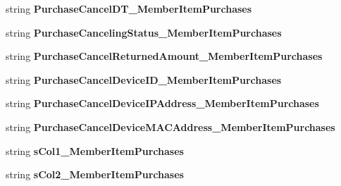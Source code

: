 \begin{DoxyCompactItemize}
\item 
string {\bfseries Purchase\+Cancel\+D\+T\+\_\+\+Member\+Item\+Purchases}\hypertarget{a00124_ab95a28db90e2b3c992571595ac09a8bb}{}\label{a00124_ab95a28db90e2b3c992571595ac09a8bb}

\item 
string {\bfseries Purchase\+Canceling\+Status\+\_\+\+Member\+Item\+Purchases}\hypertarget{a00124_aaae643da79f3b91a593ca203415f45f9}{}\label{a00124_aaae643da79f3b91a593ca203415f45f9}

\item 
string {\bfseries Purchase\+Cancel\+Returned\+Amount\+\_\+\+Member\+Item\+Purchases}\hypertarget{a00124_a7f0b791c73ca8210ffed946c098523fe}{}\label{a00124_a7f0b791c73ca8210ffed946c098523fe}

\item 
string {\bfseries Purchase\+Cancel\+Device\+I\+D\+\_\+\+Member\+Item\+Purchases}\hypertarget{a00124_afd67849dda0589a8f5989ade9affa7d2}{}\label{a00124_afd67849dda0589a8f5989ade9affa7d2}

\item 
string {\bfseries Purchase\+Cancel\+Device\+I\+P\+Address\+\_\+\+Member\+Item\+Purchases}\hypertarget{a00124_a4875b6a33b7776ca07c8f21a37b40189}{}\label{a00124_a4875b6a33b7776ca07c8f21a37b40189}

\item 
string {\bfseries Purchase\+Cancel\+Device\+M\+A\+C\+Address\+\_\+\+Member\+Item\+Purchases}\hypertarget{a00124_a6dd6adc7cdcb77eacede9241a404ee79}{}\label{a00124_a6dd6adc7cdcb77eacede9241a404ee79}

\item 
string {\bfseries s\+Col1\+\_\+\+Member\+Item\+Purchases}\hypertarget{a00124_a61d6a77eb0080eccf9d518e708169699}{}\label{a00124_a61d6a77eb0080eccf9d518e708169699}

\item 
string {\bfseries s\+Col2\+\_\+\+Member\+Item\+Purchases}\hypertarget{a00124_a51759b67dc9e97018b8898824f7ee078}{}\label{a00124_a51759b67dc9e97018b8898824f7ee078}


\end{DoxyCompactItemize}
